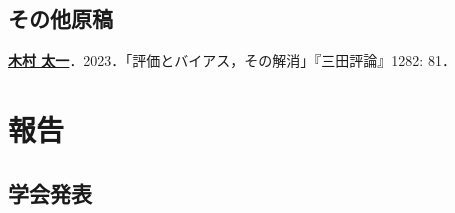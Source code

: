 \documentclass[letterpaper,11pt]{article}
\renewenvironment{itemize}{
  \begin{list}{}{
    \setlength{\leftmargin}{1.5em}
  }
}{
  \end{list}
}
\begin{document}
\subsection*{その他原稿}

\begin{itemize}
    \item \underline{\textbf{木村 太一}}．2023．「評価とバイアス，その解消」『三田評論』1282: 81．
\end{itemize}

\section*{報告}

\subsection*{学会発表}
\end{document}
